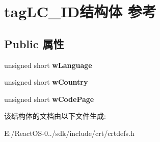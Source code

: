 \hypertarget{structtag_l_c___i_d}{}\section{tag\+L\+C\+\_\+\+I\+D结构体 参考}
\label{structtag_l_c___i_d}
\subsection*{Public 属性}
\begin{DoxyCompactItemize}
\item 
\mbox{\label{structtag_l_c___i_d_aa855d02164a9d470965f4a7c3c3e62c2}} 
unsigned short {\bfseries w\+Language}
\item 
\mbox{\label{structtag_l_c___i_d_a3bc2591f89b20c8344a213da4dc79374}} 
unsigned short {\bfseries w\+Country}
\item 
\mbox{\label{structtag_l_c___i_d_ae0d0c8996a613d00b3e396c15a5a7e47}} 
unsigned short {\bfseries w\+Code\+Page}
\end{DoxyCompactItemize}


该结构体的文档由以下文件生成\+:\begin{DoxyCompactItemize}
\item 
E\+:/\+React\+O\+S-\/0../sdk/include/crt/crtdefs.\+h\end{DoxyCompactItemize}
